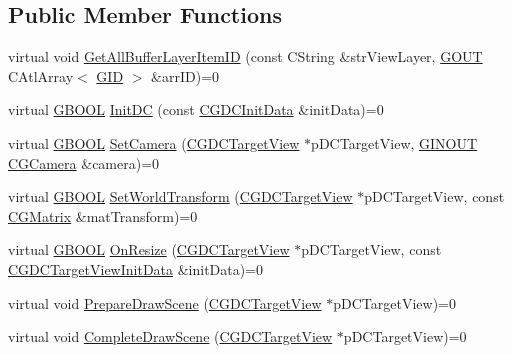 \subsection*{Public Member Functions}
\begin{DoxyCompactItemize}
\item 
virtual void \hyperlink{class_c_g_d_c_a8d808577dbb8c8df4c195586feaaf7c4}{Get\+All\+Buffer\+Layer\+Item\+I\+D} (const C\+String \&str\+View\+Layer, \hyperlink{_g_types_8h_a0858ec221262e635612871d70ca233ad}{G\+O\+U\+T} C\+Atl\+Array$<$ \hyperlink{_g_types_8h_a5b96ecb16d8e437977d12cd40aa6f6d8}{G\+I\+D} $>$ \&arr\+I\+D)=0
\item 
virtual \hyperlink{_g_types_8h_a2901915743626352a6820c5405f556dc}{G\+B\+O\+O\+L} \hyperlink{class_c_g_d_c_a712bb7f4c13060f6858525dcfcbbe397}{Init\+D\+C} (const \hyperlink{class_c_g_d_c_init_data}{C\+G\+D\+C\+Init\+Data} \&init\+Data)=0
\item 
virtual \hyperlink{_g_types_8h_a2901915743626352a6820c5405f556dc}{G\+B\+O\+O\+L} \hyperlink{class_c_g_d_c_a24e627d08ddf5b5368ae6f6370e21752}{Set\+Camera} (\hyperlink{class_c_g_d_c_target_view}{C\+G\+D\+C\+Target\+View} $\ast$p\+D\+C\+Target\+View, \hyperlink{_g_types_8h_a3fc97b512f82d8e1a710da1235f9142a}{G\+I\+N\+O\+U\+T} \hyperlink{class_c_g_camera}{C\+G\+Camera} \&camera)=0
\item 
virtual \hyperlink{_g_types_8h_a2901915743626352a6820c5405f556dc}{G\+B\+O\+O\+L} \hyperlink{class_c_g_d_c_a97d98350fc40e17a2be3bf48318dd993}{Set\+World\+Transform} (\hyperlink{class_c_g_d_c_target_view}{C\+G\+D\+C\+Target\+View} $\ast$p\+D\+C\+Target\+View, const \hyperlink{class_c_g_matrix}{C\+G\+Matrix} \&mat\+Transform)=0
\item 
virtual \hyperlink{_g_types_8h_a2901915743626352a6820c5405f556dc}{G\+B\+O\+O\+L} \hyperlink{class_c_g_d_c_a00ade1285c54b95af3704ce5aa1dd1db}{On\+Resize} (\hyperlink{class_c_g_d_c_target_view}{C\+G\+D\+C\+Target\+View} $\ast$p\+D\+C\+Target\+View, const \hyperlink{class_c_g_d_c_target_view_init_data}{C\+G\+D\+C\+Target\+View\+Init\+Data} \&init\+Data)=0
\item 
virtual void \hyperlink{class_c_g_d_c_a5bc4b6cfcd3f3feaeec185d6ab98a68b}{Prepare\+Draw\+Scene} (\hyperlink{class_c_g_d_c_target_view}{C\+G\+D\+C\+Target\+View} $\ast$p\+D\+C\+Target\+View)=0
\item 
virtual void \hyperlink{class_c_g_d_c_abab523e963f479003940ad291aa50c65}{Complete\+Draw\+Scene} (\hyperlink{class_c_g_d_c_target_view}{C\+G\+D\+C\+Target\+View} $\ast$p\+D\+C\+Target\+View)=0
\item 

\end{DoxyCompactItemize}
